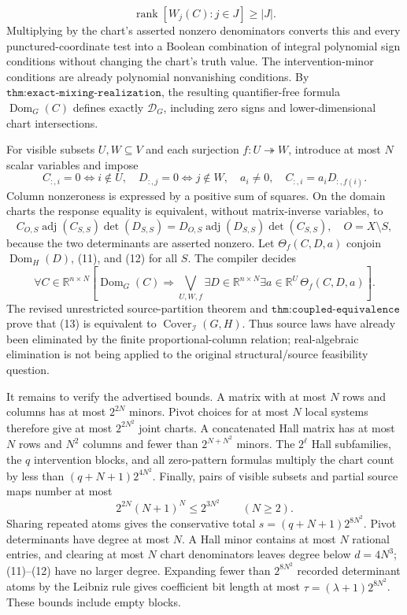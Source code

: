 \[
\operatorname{rank}[W_j(C):j\in J]\ge |J|.
\]
Multiplying by the chart's asserted nonzero denominators converts this and every punctured-coordinate test into a Boolean combination of integral polynomial sign conditions without changing the chart's truth value. The intervention-minor conditions are already polynomial nonvanishing conditions. By \(\texttt{thm:exact-mixing-realization}\), the resulting quantifier-free formula \(\operatorname{Dom}_G(C)\) defines exactly \(\mathcal D_G\), including zero signs and lower-dimensional chart intersections.

For visible subsets \(U,W\subseteq V\) and each surjection \(f:U\twoheadrightarrow W\), introduce at most \(N\) scalar variables and impose
\[
C_{:,i}=0\Longleftrightarrow i\notin U,
\quad D_{:,j}=0\Longleftrightarrow j\notin W,
\quad a_i\ne0,
\quad C_{:,i}=a_iD_{:,f(i)}. \tag{11}
\]
Column nonzeroness is expressed by a positive sum of squares. On the domain charts the response equality is equivalent, without matrix-inverse variables, to
\[
C_{O,S}\operatorname{adj}(C_{S,S})\det(D_{S,S})
=D_{O,S}\operatorname{adj}(D_{S,S})\det(C_{S,S}),
\quad O=X\setminus S, \tag{12}
\]
because the two determinants are asserted nonzero. Let \(\Theta_f(C,D,a)\) conjoin \(\operatorname{Dom}_H(D)\), (11), and (12) for all \(S\). The compiler decides
\[
\forall C\in\mathbb R^{n\times N}\left[
\operatorname{Dom}_G(C)\Longrightarrow
\bigvee_{U,W,f}\exists D\in\mathbb R^{n\times N}\exists a\in\mathbb R^U\,\Theta_f(C,D,a)
\right]. \tag{13}
\]
The revised unrestricted source-partition theorem and \(\texttt{thm:coupled-equivalence}\) prove that (13) is equivalent to \(\operatorname{Cover}_{\mathcal I}(G,H)\). Thus source laws have already been eliminated by the finite proportional-column relation; real-algebraic elimination is not being applied to the original structural/source feasibility question.

It remains to verify the advertised bounds. A matrix with at most \(N\) rows and columns has at most \(2^{2N}\) minors. Pivot choices for at most \(N\) local systems therefore give at most \(2^{2N^2}\) joint charts. A concatenated Hall matrix has at most \(N\) rows and \(N^2\) columns and fewer than \(2^{N+N^2}\) minors. The \(2^\ell\) Hall subfamilies, the \(q\) intervention blocks, and all zero-pattern formulas multiply the chart count by less than \((q+N+1)2^{4N^2}\). Finally, pairs of visible subsets and partial source maps number at most
\[
2^{2N}(N+1)^N\le 2^{3N^2}\qquad(N\ge2).
\]
Sharing repeated atoms gives the conservative total \(s=(q+N+1)2^{8N^2}\). Pivot determinants have degree at most \(N\). A Hall minor contains at most \(N\) rational entries, and clearing at most \(N\) chart denominators leaves degree below \(d=4N^3\); (11)--(12) have no larger degree. Expanding fewer than \(2^{8N^2}\) recorded determinant atoms by the Leibniz rule gives coefficient bit length at most \(\tau=(\lambda+1)2^{8N^2}\). These bounds include empty blocks.

